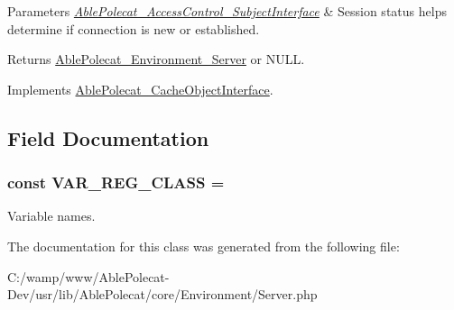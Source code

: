 \begin{DoxyParams}{Parameters}
{\em \hyperlink{interface_able_polecat___access_control___subject_interface}{Able\+Polecat\+\_\+\+Access\+Control\+\_\+\+Subject\+Interface}} & Session status helps determine if connection is new or established.\\
\hline
\end{DoxyParams}
\begin{DoxyReturn}{Returns}
\hyperlink{class_able_polecat___environment___server}{Able\+Polecat\+\_\+\+Environment\+\_\+\+Server} or N\+U\+L\+L. 
\end{DoxyReturn}


Implements \hyperlink{interface_able_polecat___cache_object_interface_a3f2135f6ad45f51d075657f6d20db2cd}{Able\+Polecat\+\_\+\+Cache\+Object\+Interface}.



\subsection{Field Documentation}
\hypertarget{class_able_polecat___environment___server_acb8e57de3e85989a3b4d1fe439cedf3d}{}
\subsubsection[{V\+A\+R\+\_\+\+R\+E\+G\+\_\+\+C\+L\+A\+S\+S}]{\setlength{\rightskip}{0pt plus 5cm}const V\+A\+R\+\_\+\+R\+E\+G\+\_\+\+C\+L\+A\+S\+S = \textquotesingle{}}\label{class_able_polecat___environment___server_acb8e57de3e85989a3b4d1fe439cedf3d}
Variable names. 

The documentation for this class was generated from the following file\+:\begin{DoxyCompactItemize}
\item 
C\+:/wamp/www/\+Able\+Polecat-\/\+Dev/usr/lib/\+Able\+Polecat/core/\+Environment/Server.\+php\end{DoxyCompactItemize}
